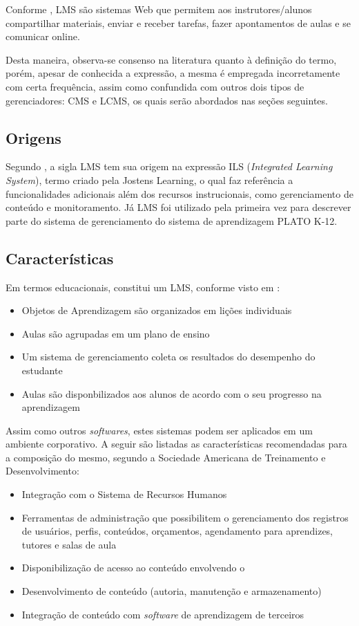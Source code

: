 \documentclass[12pt]{article}
\begin{document}
Conforme \cite{lonn2009saving}, LMS são sistemas Web que permitem aos instrutores/alunos compartilhar materiais, enviar e receber tarefas, fazer 
apontamentos de aulas e se comunicar online. 

Desta maneira, observa-se consenso na literatura quanto à definição do termo, porém, apesar de 
conhecida a expressão, a mesma é empregada incorretamente com certa frequência, assim como confundida com outros dois tipos de gerenciadores: 
CMS e LCMS, os quais serão abordados nas seções seguintes.

\subsection{Origens}

Segundo \cite{watson2007learning}, a sigla LMS tem sua origem na expressão ILS (\textit{Integrated Learning System}), termo criado pela Jostens 
Learning, o qual faz referência a funcionalidades adicionais além dos recursos instrucionais, como gerenciamento de conteúdo e monitoramento. 
Já LMS foi utilizado pela primeira vez para descrever parte do sistema de gerenciamento do sistema de aprendizagem PLATO K-12.

\subsection{Características}

Em termos educacionais, constitui um LMS, conforme visto em \cite{bailey1992wanted}:

\begin{itemize}
 \item Objetos de Aprendizagem são organizados em lições individuais
 \item Aulas são agrupadas em um plano de ensino
 \item Um sistema de gerenciamento coleta os resultados do desempenho do estudante
 \item Aulas são disponbilizados aos alunos de acordo com o seu progresso na aprendizagem
\end{itemize}

Assim como outros \textit{softwares}, estes sistemas podem ser aplicados em um ambiente corporativo. A seguir são listadas as características 
recomendadas para a composição do mesmo, segundo a Sociedade Americana de Treinamento e Desenvolvimento:
 
\begin{itemize}
 \item Integração com o Sistema de Recursos Humanos
 \item Ferramentas de administração que possibilitem o gerenciamento dos registros de usuários, perfis, conteúdos, orçamentos, agendamento para 
 aprendizes, tutores e salas de aula
 \item Disponibilização de acesso ao conteúdo envolvendo o 
 \item Desenvolvimento de conteúdo (autoria, manutenção e armazenamento)
 \item Integração de conteúdo com \textit{software} de aprendizagem de terceiros
\end{itemize}
\end{document}
